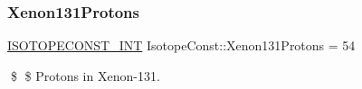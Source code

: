 \subsubsection{\texorpdfstring{Xenon131\+Protons}{Xenon131Protons}}
{\footnotesize\ttfamily \mbox{\hyperlink{group___isotope_const-_macros_ga5f18360b3e99483a35c32d789e62621c}{I\+S\+O\+T\+O\+P\+E\+C\+O\+N\+S\+T\+\_\+\+I\+NT}} Isotope\+Const\+::\+Xenon131\+Protons = 54}

\$ \$ Protons in Xenon-\/131. 